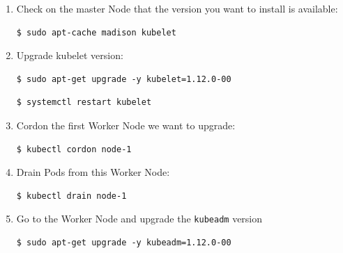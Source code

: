 \documentclass{article}
\newenvironment{codetemplate}[1][]{%
  \mybasecolorbox[#1]
  \itshape
}{%
  \endmybasecolorbox
}
\begin{document}
\begin{enumerate}
    \item Check on the master Node that the version you want to install is available:
\begin{codetemplate}{}
\begin{verbatim}
$ sudo apt-cache madison kubelet
\end{verbatim}
\end{codetemplate}

    \item Upgrade kubelet version:
\begin{codetemplate}{}
\begin{verbatim}
$ sudo apt-get upgrade -y kubelet=1.12.0-00
\end{verbatim}
\end{codetemplate}
\begin{codetemplate}{}
\begin{verbatim}
$ systemctl restart kubelet
\end{verbatim}
\end{codetemplate}

    \item Cordon the first Worker Node we want to upgrade:
\begin{codetemplate}{}
\begin{verbatim}
$ kubectl cordon node-1
\end{verbatim}
\end{codetemplate}

    \item Drain Pods from this Worker Node:
\begin{codetemplate}{}
\begin{verbatim}
$ kubectl drain node-1
\end{verbatim}
\end{codetemplate}

    \item Go to the Worker Node and upgrade the \verb|kubeadm| version
\begin{codetemplate}{}
\begin{verbatim}
$ sudo apt-get upgrade -y kubeadm=1.12.0-00
\end{verbatim}
\end{codetemplate}


\end{enumerate}
\end{document}
